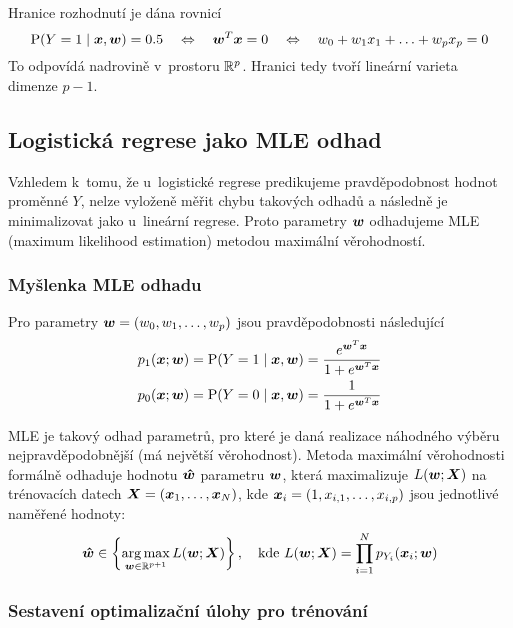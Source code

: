 Hranice rozhodnutí je dána rovnicí
\begin{equation*}
    \text{P} (Y=1 \mid \bm{x}, \bm{w} ) = 0.5
    \quad \Leftrightarrow \quad
    \bm{w}^T\bm{x} = 0
    \quad \Leftrightarrow \quad
    w_0 + w_1 x_1 + \ldots + w_p x_p = 0
\end{equation*}
To odpovídá nadrovině v~prostoru $\mathbb{R}^p$. Hranici tedy tvoří lineární varieta dimenze $p-1$.

\subsection{Logistická regrese jako MLE odhad}

Vzhledem k~tomu, že u~logistické regrese predikujeme pravděpodobnost hodnot proměnné $Y$, nelze vyloženě měřit chybu takových odhadů a následně je minimalizovat jako u~lineární regrese. Proto parametry $\bm{w}$ odhadujeme MLE (maximum likelihood estimation) metodou maximální věrohodností.

\subsubsection{Myšlenka MLE odhadu}

Pro parametry $\bm{w} = (w_0, w_1, \ldots, w_p)$ jsou pravděpodobnosti následující
\begin{align*}
    p_{1}(\bm{x}; \bm{w}) & = \text{P} (Y=1 \mid \bm{x}, \bm{w} ) = \frac{e^{\bm{w}^T\bm{x}}}{1 + e^{\bm{w}^T\bm{x}}} \\
    p_{0}(\bm{x}; \bm{w}) & = \text{P} (Y=0 \mid \bm{x}, \bm{w} ) = \frac{1}{1 + e^{\bm{w}^T\bm{x}}}
\end{align*}

MLE je takový odhad parametrů, pro které je daná realizace náhodného výběru nejpravděpodobnější (má největší věrohodnost). Metoda maximální věrohodnosti formálně odhaduje hodnotu $\bm{\hat{w}}$  parametru $\bm{w}$, která maximalizuje $L(\bm{w}; \bm{X})$ na trénovacích datech $\bm{X} = (\bm{x}_1, \ldots, \bm{x}_N)$, kde $\bm{x}_i = (1, x_{i, 1}, \ldots, x_{i, p})$ jsou jednotlivé naměřené hodnoty:
\begin{equation*}
    \bm{\hat{w}} \in \left\{\operatorname*{arg\,max}_{\bm{w} \in \mathbb{R}^{p+1}} L(\bm{w}; \bm{X})\right\},
    \quad \text{kde }
    L(\bm{w}; \bm{X}) = \prod_{i=1}^{N} p_{Y_i}(\bm{x}_i; \bm{w})
\end{equation*}

\subsubsection{Sestavení optimalizační úlohy pro trénování}

